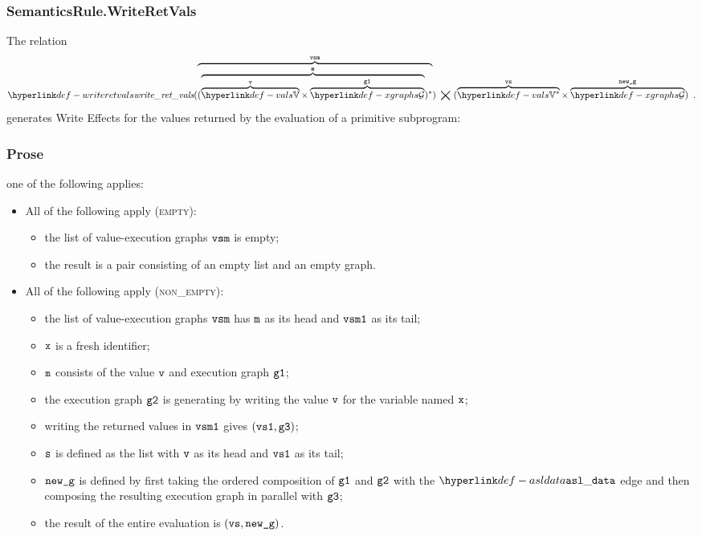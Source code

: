 \subsubsection{SemanticsRule.WriteRetVals \label{sec:SemanticsRule.WriteRetVals}}
\hypertarget{def-writeretvals}{}
The relation
\[
  \writeretvals(\overname{(\overname{\overname{\vals}{\vv}\times\overname{\XGraphs}{\vgone}}{\vm})^*}{\vvsm}) \;\aslrel\;
  (\overname{\vals^*}{\vvs}\times\overname{\XGraphs}{\newg}) \enspace.
\]
generates Write Effects for the values
returned by the evaluation of a primitive subprogram:

\subsubsection{Prose}
  one of the following applies:
  \begin{itemize}
  \item All of the following apply (\textsc{empty}):
  \begin{itemize}
    \item the list of value-execution graphs $\texttt{vsm}$ is empty;
    \item the result is a pair consisting of an empty list and an empty graph.
  \end{itemize}

  \item All of the following apply (\textsc{non\_empty}):
  \begin{itemize}
    \item the list of value-execution graphs $\texttt{vsm}$ has $\texttt{m}$ as its head and $\texttt{vsm1}$ as its tail;
    \item $\texttt{x}$ is a fresh identifier;
    \item $\texttt{m}$ consists of the value $\texttt{v}$ and execution graph $\texttt{g1}$;
    \item the execution graph $\texttt{g2}$ is generating by writing the value $\texttt{v}$ for the variable named $\texttt{x}$;
    \item writing the returned values in $\texttt{vsm1}$ gives $(\texttt{vs1}, \texttt{g3})$;
    \item $\texttt{s}$ is defined as the list with $\texttt{v}$ as its head and $\texttt{vs1}$ as its tail;
    \item $\texttt{new\_g}$ is defined by first taking the ordered composition of $\texttt{g1}$ and $\texttt{g2}$ with the $\asldata$ edge
    and then composing the resulting execution graph in parallel with $\texttt{g3}$;
    \item the result of the entire evaluation is $(\texttt{vs}, \texttt{new\_g})$.
  \end{itemize}
\end{itemize}

